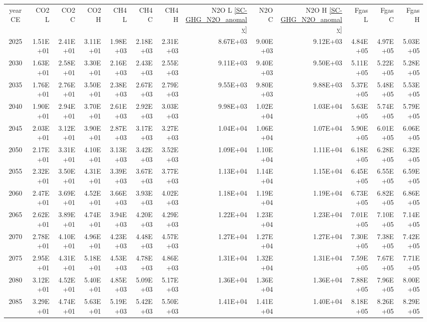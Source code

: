 \documentclass{article}
\begin{document}
\begin{table}
\begin{tabular}{crrr|rrr|rrr|rrr}
year CE  & CO2 L    & CO2 C    & CO2 H    & CH4 L    & CH4 C    & CH4 H    & N2O L \ref{SC-GHG_N2O_anomaly}     & N2O C      & N2O H \ref{SC-GHG_N2O_anomaly}    & Fgas L   & Fgas C   & Fgas H   \\
2025     & 1.51E+01 & 2.41E+01 & 3.11E+01 & 1.98E+03 & 2.18E+03 & 2.31E+03 & 8.67E+03 & 9.00E+03 & 9.12E+03 & 4.84E+05 & 4.97E+05 & 5.03E+05 \\
2030     & 1.63E+01 & 2.58E+01 & 3.30E+01 & 2.16E+03 & 2.43E+03 & 2.55E+03 & 9.11E+03 & 9.40E+03 & 9.50E+03 & 5.11E+05 & 5.22E+05 & 5.28E+05 \\
2035     & 1.76E+01 & 2.76E+01 & 3.50E+01 & 2.38E+03 & 2.67E+03 & 2.79E+03 & 9.55E+03 & 9.80E+03 & 9.88E+03 & 5.37E+05 & 5.48E+05 & 5.53E+05 \\
2040     & 1.90E+01 & 2.94E+01 & 3.70E+01 & 2.61E+03 & 2.92E+03 & 3.03E+03 & 9.98E+03 & 1.02E+04 & 1.03E+04 & 5.63E+05 & 5.74E+05 & 5.79E+05 \\
2045     & 2.03E+01 & 3.12E+01 & 3.90E+01 & 2.87E+03 & 3.17E+03 & 3.27E+03 & 1.04E+04 & 1.06E+04 & 1.07E+04 & 5.90E+05 & 6.01E+05 & 6.06E+05 \\
2050     & 2.17E+01 & 3.31E+01 & 4.10E+01 & 3.13E+03 & 3.42E+03 & 3.52E+03 & 1.09E+04 & 1.10E+04 & 1.11E+04 & 6.18E+05 & 6.28E+05 & 6.32E+05 \\
2055     & 2.32E+01 & 3.50E+01 & 4.31E+01 & 3.39E+03 & 3.67E+03 & 3.77E+03 & 1.13E+04 & 1.14E+04 & 1.15E+04 & 6.45E+05 & 6.55E+05 & 6.59E+05 \\
2060     & 2.47E+01 & 3.69E+01 & 4.52E+01 & 3.66E+03 & 3.93E+03 & 4.02E+03 & 1.18E+04 & 1.19E+04 & 1.19E+04 & 6.73E+05 & 6.82E+05 & 6.86E+05 \\
2065     & 2.62E+01 & 3.89E+01 & 4.74E+01 & 3.94E+03 & 4.20E+03 & 4.29E+03 & 1.22E+04 & 1.23E+04 & 1.23E+04 & 7.01E+05 & 7.10E+05 & 7.14E+05 \\
2070     & 2.78E+01 & 4.10E+01 & 4.96E+01 & 4.23E+03 & 4.48E+03 & 4.57E+03 & 1.27E+04 & 1.27E+04 & 1.27E+04 & 7.30E+05 & 7.38E+05 & 7.42E+05 \\
2075     & 2.95E+01 & 4.31E+01 & 5.18E+01 & 4.53E+03 & 4.78E+03 & 4.86E+03 & 1.31E+04 & 1.32E+04 & 1.31E+04 & 7.59E+05 & 7.67E+05 & 7.71E+05 \\
2080     & 3.12E+01 & 4.52E+01 & 5.40E+01 & 4.85E+03 & 5.09E+03 & 5.17E+03 & 1.36E+04 & 1.36E+04 & 1.36E+04 & 7.88E+05 & 7.96E+05 & 8.00E+05 \\
2085     & 3.29E+01 & 4.74E+01 & 5.63E+01 & 5.19E+03 & 5.42E+03 & 5.50E+03 & 1.41E+04 & 1.41E+04 & 1.40E+04 & 8.18E+05 & 8.26E+05 & 8.29E+05 \\

\end{tabular}
\end{table}
\end{document}
